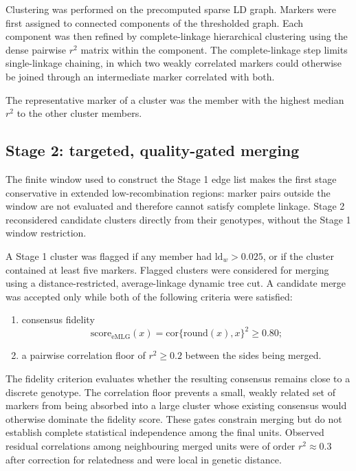 \documentclass[11pt]{article}
\begin{document}
Clustering was performed on the precomputed sparse LD graph. Markers were first
assigned to connected components of the thresholded graph. Each component was
then refined by complete-linkage hierarchical clustering using the dense
pairwise \(r^2\) matrix within the component. The complete-linkage step limits
single-linkage chaining, in which two weakly correlated markers could otherwise
be joined through an intermediate marker correlated with both.

The representative marker of a cluster was the member with the highest median
\(r^2\) to the other cluster members.

\subsection{Stage 2: targeted, quality-gated merging}

The finite window used to construct the Stage 1 edge list makes the first stage
conservative in extended low-recombination regions: marker pairs outside the
window are not evaluated and therefore cannot satisfy complete linkage. Stage
2 reconsidered candidate clusters directly from their genotypes, without the
Stage 1 window restriction.

A Stage 1 cluster was flagged if any member had
\(\mathrm{ld}_w>0.025\), or if the cluster contained at least five markers.
Flagged clusters were considered for merging using a distance-restricted,
average-linkage dynamic tree cut. A candidate merge was accepted only while
both of the following criteria were satisfied:
\begin{enumerate}
  \item consensus fidelity
  \[
    \mathrm{score}_{\mathrm{eMLG}}(x)
    =\mathrm{cor}\{\mathrm{round}(x),x\}^{2} \geq 0.80;
  \]
  \item a pairwise correlation floor of \(r^2\geq0.2\) between the sides being
        merged.
\end{enumerate}

The fidelity criterion evaluates whether the resulting consensus remains close
to a discrete genotype. The correlation floor prevents a small, weakly related
set of markers from being absorbed into a large cluster whose existing
consensus would otherwise dominate the fidelity score. These gates constrain
merging but do not establish complete statistical independence among the final
units. Observed residual correlations among neighbouring merged units were of
order \(r^2\approx0.3\) after correction for relatedness and were local in
genetic distance.
\end{document}
